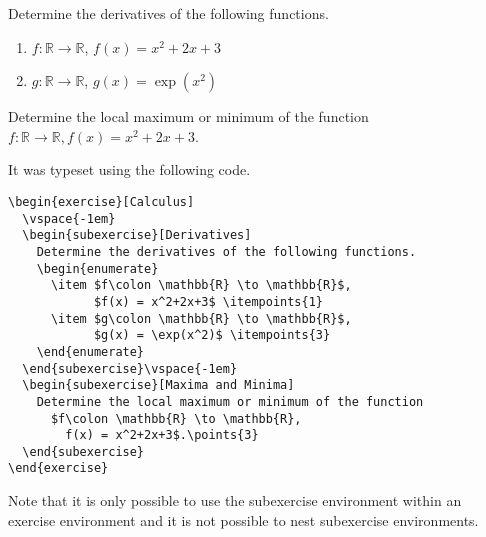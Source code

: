 \documentclass[
  twocolumn,%
  fontsize=9pt,%
  DIV=calc,%
  numbers=noendperiod%
]{scrartcl}
\begin{document}
\begin{exercise}[Calculus]
  \vspace{-1em}
  \begin{subexercise}[Derivatives]
    Determine the derivatives of the following functions.
    \begin{enumerate}
      \item $f\colon \mathbb{R} \to \mathbb{R}$, $f(x) = x^2+2x+3$ 
      \item $g\colon \mathbb{R} \to \mathbb{R}$, $g(x) = \exp(x^2)$ 
    \end{enumerate}
  \end{subexercise}\vspace{-1em}
  \begin{subexercise}
    Determine the local maximum or minimum of the function $f\colon \mathbb{R} \to \mathbb{R}, f(x) = x^2+2x+3$.
  \end{subexercise}\vspace{-1em}
\end{exercise}

\noindent It was typeset using the following code.

\begin{lstlisting}
\begin{exercise}[Calculus]
  \vspace{-1em}
  \begin{subexercise}[Derivatives]
    Determine the derivatives of the following functions.
    \begin{enumerate}
      \item $f\colon \mathbb{R} \to \mathbb{R}$, 
            $f(x) = x^2+2x+3$ \itempoints{1}
      \item $g\colon \mathbb{R} \to \mathbb{R}$, 
            $g(x) = \exp(x^2)$ \itempoints{3}
    \end{enumerate}
  \end{subexercise}\vspace{-1em}
  \begin{subexercise}[Maxima and Minima]
    Determine the local maximum or minimum of the function 
      $f\colon \mathbb{R} \to \mathbb{R}, 
        f(x) = x^2+2x+3$.\points{3}
  \end{subexercise}
\end{exercise}
\end{lstlisting}

\noindent Note that it is only possible to use the subexercise environment within an exercise environment and it is not possible to nest subexercise environments.
\end{document}
